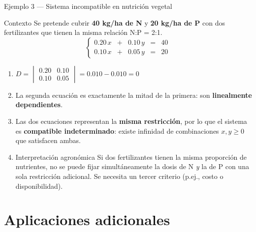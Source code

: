 \documentclass[11pt, aspectratio=169]{beamer}
\newcommand{\deter}[4]{\begin{vmatrix} #1 & #2 \\ #3 & #4 \end{vmatrix}}
\begin{document}
	\begin{frame}{Ejemplo 3 — Sistema incompatible en nutrición vegetal}
		\begin{exampleblock}{Contexto}
			Se pretende cubrir \textbf{40 kg/ha de N} y \textbf{20 kg/ha de P} con dos
			fertilizantes que tienen la misma relación N:P = 2:1.
			\[
			\left\{
			\begin{array}{rcrcr}
				0.20\,x & + & 0.10\,y & = & 40\\[4pt]
				0.10\,x & + & 0.05\,y & = & 20
			\end{array}
			\right.
			\]
		\end{exampleblock}
		
		\begin{enumerate}
			\item<2-> $D = \deter{0.20}{0.10}{0.10}{0.05} = 0.010 - 0.010 = 0$
			\item<3-> La segunda ecuación es exactamente la mitad de la primera:
			son \textbf{linealmente dependientes}.
			\item<4-> Las dos ecuaciones representan la \textbf{misma restricción},
			por lo que el sistema es \textbf{compatible indeterminado}:
			existe infinidad de combinaciones $x, y \geq 0$ que satisfacen ambas.
			\item<5->
			\begin{alertblock}{Interpretación agronómica}
				Si dos fertilizantes tienen la misma proporción de nutrientes,
				no se puede fijar simultáneamente la dosis de N \textit{y} la de P
				con una sola restricción adicional. Se necesita un tercer criterio
				(p.ej., costo o disponibilidad).
			\end{alertblock}
		\end{enumerate}
	\end{frame}
	
	\section{Aplicaciones adicionales}
	
\end{document}
